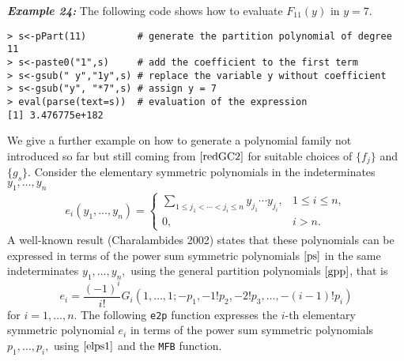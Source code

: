 \hskip-0.5cm\textbf{\emph{Example 24:}} The following code shows how to evaluate \(F_{11}(y)\) in \(y=7.\)

\begin{verbatim}
> s<-pPart(11)         # generate the partition polynomial of degree 11
> s<-paste0("1",s)     # add the coefficient to the first term  
> s<-gsub(" y","1y",s) # replace the variable y without coefficient  
> s<-gsub("y", "*7",s) # assign y = 7
> eval(parse(text=s))  # evaluation of the expression
[1] 3.476775e+182
\end{verbatim}

We give a further example on how to generate a polynomial family not introduced so far but still coming from \(\eqref{redGC2}\) for suitable choices of \(\{f_j\}\) and \(\{g_{s}\}.\) Consider the elementary symmetric polynomials in the indeterminates \(y_1, \ldots, y_n\)
\begin{eqnarray}  
e_i(y_1, \ldots, y_n) = \left\{ \begin{array}{cl} 
\displaystyle{\sum_{1\leq j_1 < \cdots < j_i \leq n}} y_{j_1} \cdots y_{j_i}, & 1 \leq i \leq n, \\
0,      &  i > n.
\end{array}
\right.
\end{eqnarray}
A well-known result (Charalambides 2002) states that these polynomials can be expressed in terms of the power sum symmetric polynomials \(\eqref{ps}\) in the same indeterminates \(y_1, \ldots, y_n,\) using the general partition polynomials \(\eqref{gpp}\), that is
\begin{equation}
e_i = \frac{(-1)^i}{i!} G_i (1, \ldots, 1; - p_1, - 1! p_2, - 2! p_3, \ldots, -(i-1)! p_i)
\label{elps1}
\end{equation}
for \(i=1, \ldots, n.\) The following \texttt{e2p} function expresses the \(i\)-th elementary symmetric polynomial \(e_i\) in terms of the power sum symmetric polynomials \(p_1, \ldots, p_i,\) using \(\eqref{elps1}\) and the \texttt{MFB} function.

